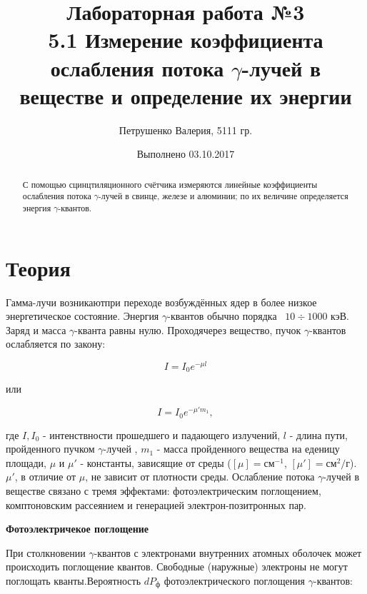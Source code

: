 \documentclass[letterpaper,12pt]{article}
\begin{document}
	
	\title{\textbf{Лабораторная работа №3}\vspace{3mm} \\ 5.1 Измерение коэффициента ослабления потока $\gamma$-лучей в веществе и определение их энергии}
	\author{Петрушенко Валерия, 5111 гр.}
	\date{Выполнено 03.10.2017}
	\maketitle
	\renewcommand{\abstractname}{\vspace{-\baselineskip}}
	
	\begin{abstract}
		С помощью сцинцтиляционного счётчика измеряются линейные коэффициенты ослабления потока $\gamma$-лучей  в свинце, железе и алюминии; по их величине определяется энергия $\gamma$-квантов.
		
	\end{abstract}
	
	
	\section{Теория}
	Гамма-лучи возникаютпри переходе возбуждённых ядер в более низкое энергетическое состояние. Энергия $\gamma$-квантов обычно порядка ~$10\div1000$ кэВ. Заряд и масса $\gamma$-кванта равны нулю. Проходячерез вещество, пучок $\gamma$-квантов ослабляется по закону:
	
	\begin{equation}
	I = I_0e^{-\mu l}
	\end{equation}
	
	
	или
	
	
	\begin{equation}
	I=I_0e^{-\mu' m_1}, 
	\end{equation}
	
	где $I, I_0$ - интенствности прошедшего и падающего излучений, $l$ - длина пути, пройденного  пучком $\gamma$-лучей	, $m_1$ - масса пройденного вещества на еденицу площади, $\mu$ и $\mu'$ - константы, зависящие от среды ($[\mu] = \text{см}^{-1}$, $[\mu'] = \text{см}^{2}/\text{г}$). $\mu'$, в отличие от $\mu$, не зависит от плотности среды. Ослабление потока    $\gamma$-лучей в веществе связано с тремя эффектами: фотоэлектрическим поглощением, комптоновским рассеянием и генерацией электрон-позитронных пар. 
	
	\vspace{0.5cm}
\textbf{Фотоэлектричекое поглощение}

	При столкновении $\gamma$-квантов с электронами внутренних атомных оболочек может происходить поглощение квантов. Свободные (наружные) электроны не могут поглощать кванты.Вероятность $dP_\text{ф}$ фотоэлектрического поглощения $\gamma$-квантов: 
	
\end{document}
